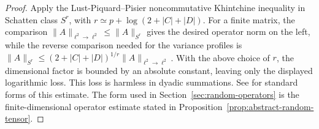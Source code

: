 \documentclass[10pt]{amsart}
\numberwithin{equation}{section}
\theoremstyle{plain}
\theoremstyle{definition}
\theoremstyle{remark}
\begin{document}
\begin{proof}
Apply the Lust-Piquard--Pisier noncommutative Khintchine inequality in Schatten class $S^r$, with $r\simeq p+\log(2+|C|+|D|)$.  For a finite matrix, the comparison $\|A\|_{\ell^2\to\ell^2}\le\|A\|_{S^r}$ gives the desired operator norm on the left, while the reverse comparison needed for the variance profiles is $\|A\|_{S^r}\le (2+|C|+|D|)^{1/r}\|A\|_{\ell^2\to\ell^2}$.  With the above choice of $r$, the dimensional factor is bounded by an absolute constant, leaving only the displayed logarithmic loss.  This loss is harmless in dyadic summations.  See \cite{LustPisier,DNY} for standard forms of this estimate.  The form used in Section~\ref{sec:random-operators} is the finite-dimensional operator estimate stated in Proposition~\ref{prop:abstract-random-tensor}.
\end{proof}
\end{document}
